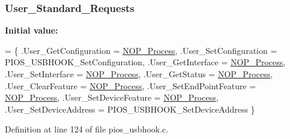 \hypertarget{group___p_i_o_s___u_s_b_h_o_o_k_ga8d70d0a7e05cf9c172e4304def6b65b8}{
\subsubsection[{User\-\_\-\-Standard\-\_\-\-Requests}]{ User\-\_\-\-Standard\-\_\-\-Requests}}\label{group___p_i_o_s___u_s_b_h_o_o_k_ga8d70d0a7e05cf9c172e4304def6b65b8}
{\bfseries Initial value\-:}
\begin{DoxyCode}
= \{
        .User\_GetConfiguration   = \hyperlink{_s_t_m32_f10x_2_libraries_2_s_t_m32___u_s_b-_f_s-_device___driver_2inc_2usb__core_8h_a5576d2ea5bf87fec71925b8e20048e74}{NOP\_Process},
        .User\_SetConfiguration   = PIOS\_USBHOOK\_SetConfiguration,
        .User\_GetInterface       = \hyperlink{_s_t_m32_f10x_2_libraries_2_s_t_m32___u_s_b-_f_s-_device___driver_2inc_2usb__core_8h_a5576d2ea5bf87fec71925b8e20048e74}{NOP\_Process},
        .User\_SetInterface       = \hyperlink{_s_t_m32_f10x_2_libraries_2_s_t_m32___u_s_b-_f_s-_device___driver_2inc_2usb__core_8h_a5576d2ea5bf87fec71925b8e20048e74}{NOP\_Process},
        .User\_GetStatus          = \hyperlink{_s_t_m32_f10x_2_libraries_2_s_t_m32___u_s_b-_f_s-_device___driver_2inc_2usb__core_8h_a5576d2ea5bf87fec71925b8e20048e74}{NOP\_Process},
        .User\_ClearFeature       = \hyperlink{_s_t_m32_f10x_2_libraries_2_s_t_m32___u_s_b-_f_s-_device___driver_2inc_2usb__core_8h_a5576d2ea5bf87fec71925b8e20048e74}{NOP\_Process},
        .User\_SetEndPointFeature = \hyperlink{_s_t_m32_f10x_2_libraries_2_s_t_m32___u_s_b-_f_s-_device___driver_2inc_2usb__core_8h_a5576d2ea5bf87fec71925b8e20048e74}{NOP\_Process},
        .User\_SetDeviceFeature   = \hyperlink{_s_t_m32_f10x_2_libraries_2_s_t_m32___u_s_b-_f_s-_device___driver_2inc_2usb__core_8h_a5576d2ea5bf87fec71925b8e20048e74}{NOP\_Process},
        .User\_SetDeviceAddress   = PIOS\_USBHOOK\_SetDeviceAddress
\}
\end{DoxyCode}


Definition at line 124 of file pios\-\_\-usbhook.\-c.

